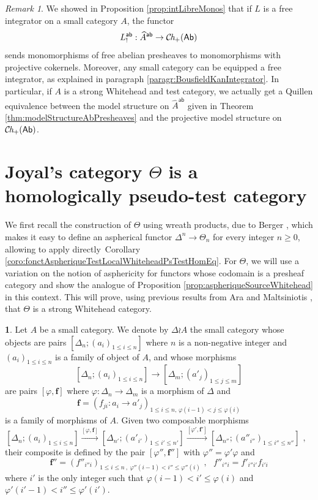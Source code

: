 \documentclass[10pt, english, a4paper, nothms]{amsart}
\theoremstyle{plain}
\theoremstyle{remark}
\newtheorem{remark}[theorem]{Remark}
\theoremstyle{definition}
\newtheorem{paragr}[theorem]{}
\numberwithin{equation}{theorem}
\renewcommand\leq\leqslant
\renewcommand\geq\geqslant
\newcommand{\Ch}{{\mathcal{C}\mspace{-2.mu}\it{h}_{+}}}
\newcommand{\Ab}{{\mathsf{Ab}}}
\newcommand{\ab}{{\mathsf{ab}}}
\newcommand{\prefab}[1]{\widehat{ #1 }^{\mathsf{ab}}}
\newcommand{\mdvirg}{\text{ ,}\hspace{10pt}}
\begin{document}
\begin{remark}
We showed in Proposition \ref{prop:intLibreMonos} that if $L$ is a free
integrator on a small category $A$, the functor
\[
  L_!^\ab: \prefab{A} \to \Ch(\Ab)
\]
sends monomorphisms of free abelian presheaves to monomorphisms with projective
cokernels. Moreover, any small category can be equipped a free integrator, as
explained in paragraph \ref{paragr:BousfieldKanIntegrator}. In particular, if
$A$ is a strong Whitehead and test category, we actually get a Quillen
equivalence between the model structure on $\prefab{A}$ given in Theorem
\ref{thm:modelStructureAbPresheaves} and the projective model
structure on~$\Ch(\Ab)$. 
\end{remark}

\section{\texorpdfstring{Joyal's category $\Theta$ is a homologically
pseudo-test category}%
{Joyal's category {Θ} is a homologically pseudo-test category}}
\label{sec:theta}


We first recall the construction of $\Theta$ using wreath products, due to
Berger \cite{berger2007iterated}, which makes it easy to define an
aspherical functor $\Delta^n \to \Theta_n$ for every integer $n \geq 0$,
allowing to apply directly~Corollary
\ref{coro:fonctAspheriqueTestLocalWhiteheadPsTestHomEq}.
For $\Theta$, we will use a variation on the notion of asphericity for functors
whose codomain is a presheaf category and show the analogue of Proposition
\ref{prop:aspheriqueSourceWhitehead} in this context. This will prove, using
previous results from Ara and Maltsiniotis \cite{ara2022compnerfs}, that
$\Theta$ is a strong Whitehead category.

\begin{paragr}
Let $A$ be a small category. We denote by $\Delta\wr A$ the small
category whose objects are pairs $[\Delta_n;(a_i)_{1\leq i \leq n}]$ where
$n$ is a non-negative integer and $(a_i)_{1 \leq i \leq n}$ is a
family of object of $A$, and whose morphisms 
\[
  [\Delta_n;(a_i)_{1 \leq i \leq n}] \to [\Delta_m;(a'_j)_{1 \leq j
  \leq m}]
\]
are pairs $[\varphi, \mathbf{f}]$ where $\varphi: \Delta_n \to
\Delta_m$ is a morphism of $\Delta$ and 
\[
    \mathbf{f}=(f_{ji}:a_i \to a'_j)
    _{
      1 \leq i \leq n,\,\varphi(i-1)<j\leq\varphi(i)
    }
\]
is a family of morphisms of $A$. Given two composable morphisms
\[
  [\Delta_{n}  ;( a_i)_{1 \leq i \leq n} ] \xrightarrow{[\varphi, \mathbf{f}]}
  [\Delta_{n'} ;( a'_{i'})_{1 \leq i' \leq n'}] \xrightarrow{[\varphi', \mathbf{f'}]}
  [\Delta_{n''};( a''_{i''})_{1 \leq i'' \leq n''}] \mdvirg
\]
their composite is defined by the pair $[\varphi'',\mathbf{f''}]$
with $\varphi''=\varphi'\varphi$ and
\[
\mathbf{f''}=(f''_{i''i})_{
    1 \leq i \leq n~,~
    \varphi''(i-1) < i'' \leq \varphi''(i) } \mdvirg
    f''_{i''i} = f'_{i''i'}f_{i'i}
\]
where $i'$ is the only integer such that $\varphi(i-1) < i' \leq
\varphi(i)$ and $ \varphi'{(i'-1)} < i'' \leq \varphi'(i')$. 
\end{paragr}
\end{document}
